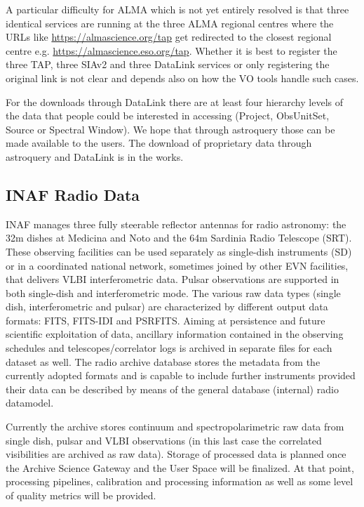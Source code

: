 \documentclass[11pt,a4paper]{ivoa}
\begin{document}
A particular difficulty for ALMA which is not yet entirely resolved is that three identical services are running at the three ALMA regional centres where the URLs like \url{https://almascience.org/tap} get redirected
to the closest regional centre e.g. \url{https://almascience.eso.org/tap}.
Whether it is best to register the three TAP, three SIAv2 and three DataLink services or only registering the original link is not clear and
depends also on how the VO tools handle such cases.

For the downloads through DataLink there are at least four hierarchy
levels of the data that people could be interested in accessing (Project, ObsUnitSet, Source or Spectral Window). We hope that through astroquery those can be made available to the users. The download of proprietary data through astroquery and DataLink is in
the works.

\subsection{INAF Radio Data}
\label{sec:INAF}
INAF manages three fully steerable reflector antennas for radio astronomy: the 32m dishes at Medicina and Noto and the 64m Sardinia Radio Telescope (SRT). These observing facilities can be used separately as single-dish instruments (SD) or in a coordinated national network, sometimes joined by other EVN facilities, that delivers VLBI interferometric data. Pulsar observations are supported in both single-dish and interferometric mode. The various raw data types (single dish, interferometric and pulsar) are characterized by different output data formats: FITS, FITS-IDI and PSRFITS. Aiming at persistence and future scientific exploitation of data, ancillary information contained in the observing schedules and telescopes/correlator logs is archived in separate files for each dataset as well. The radio archive database stores the metadata from the currently adopted formats and is capable to include further instruments provided their data can be described by means of the general database (internal) radio datamodel.

Currently the archive stores continuum and spectropolarimetric raw data from single dish, pulsar and VLBI observations (in this last case the correlated visibilities are archived as raw data). Storage of processed data is planned once the Archive Science Gateway and the User Space will be finalized. At that point, processing pipelines, calibration and processing information as well as some level of quality metrics will be provided.
\end{document}
